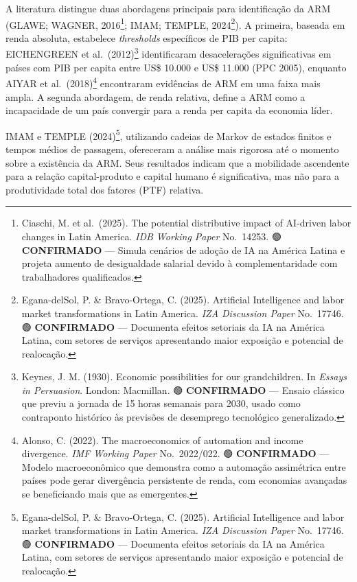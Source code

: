 \documentclass[
  brazilian,
  12pt,
]{article}
\begin{document}
A literatura distingue duas abordagens principais para identificação da ARM (GLAWE; WAGNER, 2016\footnote{Ciaschi, M. et al.~(2025). The potential distributive impact of AI-driven labor changes in Latin America. \emph{IDB Working Paper} No.~14253. 🟢 \textbf{CONFIRMADO} --- Simula cenários de adoção de IA na América Latina e projeta aumento de desigualdade salarial devido à complementaridade com trabalhadores qualificados.}; IMAM; TEMPLE, 2024\footnote{Egana-delSol, P. \& Bravo-Ortega, C. (2025). Artificial Intelligence and labor market transformations in Latin America. \emph{IZA Discussion Paper} No.~17746. 🟢 \textbf{CONFIRMADO} --- Documenta efeitos setoriais da IA na América Latina, com setores de serviços apresentando maior exposição e potencial de realocação.}). A primeira, baseada em renda absoluta, estabelece \emph{thresholds} específicos de PIB per capita: EICHENGREEN et al.~(2012)\footnote{Keynes, J. M. (1930). Economic possibilities for our grandchildren. In \emph{Essays in Persuasion}. London: Macmillan. 🟢 \textbf{CONFIRMADO} --- Ensaio clássico que previu a jornada de 15 horas semanais para 2030, usado como contraponto histórico às previsões de desemprego tecnológico generalizado.} identificaram desacelerações significativas em países com PIB per capita entre US\$ 10.000 e US\$ 11.000 (PPC 2005), enquanto AIYAR et al.~(2018)\footnote{Alonso, C. (2022). The macroeconomics of automation and income divergence. \emph{IMF Working Paper} No.~2022/022. 🟢 \textbf{CONFIRMADO} --- Modelo macroeconômico que demonstra como a automação assimétrica entre países pode gerar divergência persistente de renda, com economias avançadas se beneficiando mais que as emergentes.} encontraram evidências de ARM em uma faixa mais ampla. A segunda abordagem, de renda relativa, define a ARM como a incapacidade de um país convergir para a renda per capita da economia líder.

IMAM e TEMPLE (2024)\footnote{Egana-delSol, P. \& Bravo-Ortega, C. (2025). Artificial Intelligence and labor market transformations in Latin America. \emph{IZA Discussion Paper} No.~17746. 🟢 \textbf{CONFIRMADO} --- Documenta efeitos setoriais da IA na América Latina, com setores de serviços apresentando maior exposição e potencial de realocação.}, utilizando cadeias de Markov de estados finitos e tempos médios de passagem, ofereceram a análise mais rigorosa até o momento sobre a existência da ARM. Seus resultados indicam que a mobilidade ascendente para a relação capital-produto e capital humano é significativa, mas não para a produtividade total dos fatores (PTF) relativa.
\end{document}
